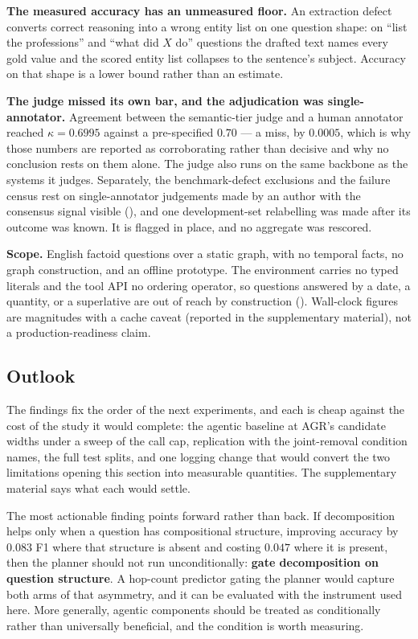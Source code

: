 \textbf{The measured accuracy has an unmeasured floor.} An extraction
defect converts correct reasoning into a wrong entity list on one
question shape: on ``list the professions'' and ``what did $X$ do''
questions the drafted text names every gold value and the scored entity
list collapses to the sentence's subject. Accuracy on that shape is a
lower bound rather than an estimate.

\textbf{The judge missed its own bar, and the adjudication was
single-annotator.} Agreement between the semantic-tier judge and a human
annotator reached $\kappa = 0.6995$ against a pre-specified $0.70$ --- a
miss, by $0.0005$, which is why those numbers are reported as
corroborating rather than decisive and why no conclusion rests on them
alone. The judge also runs on the same backbone as the systems it
judges. Separately, the benchmark-defect exclusions and the failure
census rest on single-annotator judgements made by an author with the
consensus signal visible (), and one
development-set relabelling was made after its outcome was known. It is
flagged in place, and no aggregate was rescored.

\textbf{Scope.} English factoid questions over a static graph, with no
temporal facts, no graph construction, and an offline prototype. The
environment carries no typed literals and the tool API no ordering
operator, so questions answered by a date, a quantity, or a superlative
are out of reach by construction (). Wall-clock
figures are magnitudes with a cache caveat (reported in the
supplementary material), not a production-readiness claim.

\subsection{Outlook}\label{sec:outlook}

The findings fix the order of the next experiments, and each is cheap
against the cost of the study it would complete: the agentic baseline at
AGR's candidate widths under a sweep of the call cap, replication with
the joint-removal condition  names, the full test
splits, and one logging change that would convert the two limitations
opening this section into measurable quantities. The supplementary
material says what each would settle.

The most actionable finding points forward rather than back. If
decomposition helps only when a question has compositional structure,
improving accuracy by $0.083$ F1 where that structure is absent and
costing $0.047$ where it is present, then the planner should not run
unconditionally: \textbf{gate decomposition on question structure}. A
hop-count predictor gating the planner would capture both arms of that
asymmetry, and it can be evaluated with the instrument used here. More
generally, agentic components should be treated as conditionally rather
than universally beneficial, and the condition is worth measuring.
